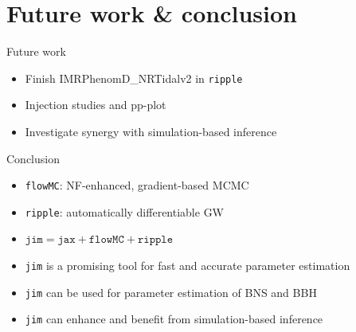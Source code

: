 \documentclass[usenames,dvipsnames,t]{beamer}
\begin{document}
\section{Future work \& conclusion}

\begin{frame}{Future work}

  \def\x{3mm}

  \begin{itemize}
    \item Finish IMRPhenomD\_NRTidalv2 in \texttt{ripple}
    
    \vspace{\x}
    
    \item Injection studies and pp-plot
    
    \vspace{\x}
    
    \item Investigate synergy with simulation-based inference 
  \end{itemize}

\end{frame}

\begin{frame}{Conclusion}

  \def\x{4mm}


  \begin{itemize}
    \item \texttt{flowMC}: NF-enhanced, gradient-based MCMC
    
    \vspace{\x}
    
    \item \texttt{ripple}: automatically differentiable GW
    
    \vspace{\x}
    
    \item $\texttt{jim} = \texttt{jax} + \texttt{flowMC} + \texttt{ripple}$
    
    \vspace{\x}
    
    \item \texttt{jim} is a promising tool for fast and accurate parameter estimation
    
    \vspace{\x}

    \item \texttt{jim} can be used for parameter estimation of BNS and BBH
    
    \vspace{\x}
    
    \item \texttt{jim} can enhance and benefit from simulation-based inference
    
  \end{itemize}
    
\end{frame}
\end{document}
